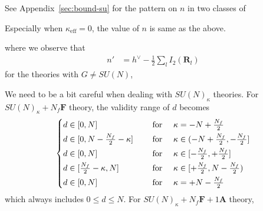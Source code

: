 \documentclass[letterpaper, 11pt]{article}
\def\k{\kappa}
\begin{document}
{  See Appendix~\ref{sec:bound-su} for the pattern on $n$ in  two classes of 



Especially when $\k_\text{eff} = 0$, the value of $n$ is same as the above. 







where we observe that 
\begin{align}
  n' &= \textstyle h^\vee - \frac{1}{2} \sum_{l}I_2(\mathbf{R}_l)
\end{align}
for the theories with $G\neq SU(N)$,


We need to be a bit careful when dealing with $SU(N)_\k$ theories. For $SU(N)_\kappa + N_f\mathbf{F}$ theory, the validity range of $d$ becomes
\begin{align}
  \begin{dcases}
    d \in [0 , N] &\quad\text{ for }\quad \k = -N +\tfrac{N_f}{2} \\
    d \in [0, N-\tfrac{N_f}{2}-\kappa] &\quad\text{ for } \quad \k \in (-N +\tfrac{N_f}{2}, -\tfrac{N_f}{2}]\\
    d \in [0, N] &\quad\text{ for } \quad \k \in [-\tfrac{N_f}{2}, +\tfrac{N_f}{2}] \\
    d \in [\tfrac{N_f}{2}-\kappa, N] &\quad\text{ for } \quad\k \in [+\tfrac{N_f}{2}, N-\tfrac{N_f}{2}) \\
    d \in [0, N] &\quad\text{ for }\quad  \k = +N -\tfrac{N_f}{2} 
  \end{dcases}
\end{align}
which always includes $0 \leq d \leq N$. For $SU(N)_\kappa + N_f\mathbf{F} + 1\mathbf{A}$ theory, 


}
\end{document}
